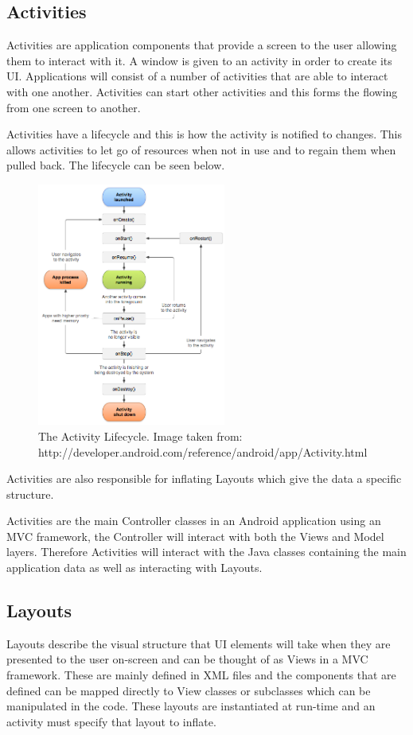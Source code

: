\documentclass{l4proj}
\begin{document}

\subsection{Activities}
Activities are application components that provide a screen to the user allowing them to interact with it.  A window is given to an activity in order to create its UI.  Applications will consist of a number of activities that are able to interact with one another.  Activities can start other activities and this forms the flowing from one screen to another.  

Activities have a lifecycle and this is how the activity is notified to changes. This allows activities to let go of resources when not in use and to regain them when pulled back.  The lifecycle can be seen below.


\begin{figure}
\centering
\includegraphics[height=8cm]{activity_lifecycle.png}
\caption{The Activity Lifecycle.  Image taken from:  http://developer.android.com/reference/android/app/Activity.html}
\label{Activity Lifecycle}
\end{figure}

Activities are also responsible for inflating Layouts which give the data a specific structure.

Activities are the main Controller classes in an Android application using an MVC framework, the Controller will interact with both the Views and Model layers. Therefore Activities will interact with the Java classes containing the main application data as well as interacting with Layouts.

\subsection{Layouts}
Layouts describe the visual structure that UI elements will take when they are presented to the user on-screen and can be thought of as Views in a MVC framework.  These are mainly defined in XML files and the components that are defined can be mapped directly to  View classes or subclasses which can be manipulated in the code. These layouts are instantiated at run-time and an activity must specify that layout to inflate.  
\end{document}
